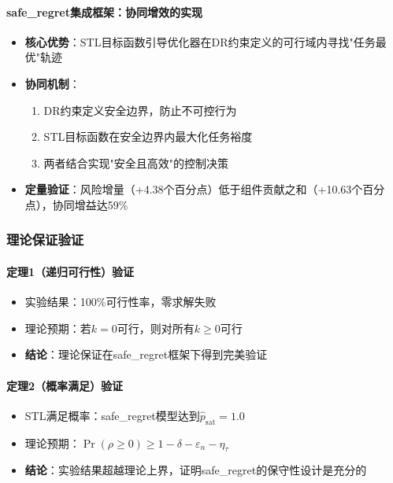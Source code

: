 \documentclass[12pt,a4paper]{ctexart}
\numberwithin{equation}{section}
\begin{document}
\paragraph*{safe\_regret集成框架：协同增效的实现}
\begin{itemize}
    \item \textbf{核心优势}：STL目标函数引导优化器在DR约束定义的可行域内寻找"任务最优"轨迹
    \item \textbf{协同机制}：
    \begin{enumerate}[label=(\roman*)]
        \item DR约束定义安全边界，防止不可控行为
        \item STL目标函数在安全边界内最大化任务裕度
        \item 两者结合实现"安全且高效"的控制决策
    \end{enumerate}
    \item \textbf{定量验证}：风险增量（+4.38个百分点）低于组件贡献之和（+10.63个百分点），协同增益达59\%
\end{itemize}

\subsubsection{理论保证验证}

\paragraph*{定理1（递归可行性）验证}
\begin{itemize}
    \item 实验结果：100\%可行性率，零求解失败
    \item 理论预期：若$k=0$可行，则对所有$k\ge 0$可行
    \item \textbf{结论}：理论保证在safe\_regret框架下得到完美验证
\end{itemize}

\paragraph*{定理2（概率满足）验证}
\begin{itemize}
    \item STL满足概率：safe\_regret模型达到$\widehat{p}_{\mathrm{sat}} = 1.0$
    \item 理论预期：$\Pr(\rho \ge 0) \ge 1 - \delta - \varepsilon_n - \eta_\tau$
    \item \textbf{结论}：实验结果超越理论上界，证明safe\_regret的保守性设计是充分的
\end{itemize}
\end{document}
